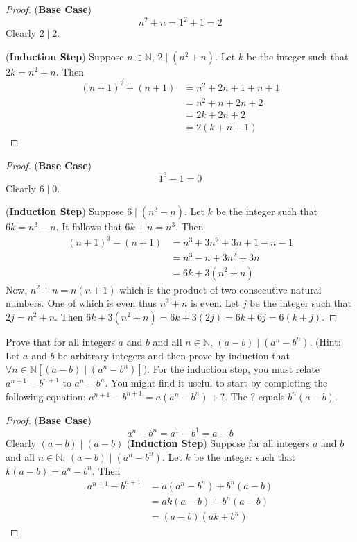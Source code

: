 \begin{proof}
    (\textbf{Base Case}) 
    \[n^2 + n = 1^2 + 1 = 2\]
    Clearly $2 \mid 2$.

    (\textbf{Induction Step})
    Suppose $n \in \mathbb{N}$, $2 \mid (n^2 + n)$.
    Let $k$ be the integer such that $2k = n^2 + n$.
    Then
    \begin{align*}
        (n + 1)^2 + (n + 1) &= n^2 + 2n + 1 + n + 1 \\
        &= n^2 + n + 2n + 2 \\
        &= 2k + 2n + 2 \\
        &= 2(k + n + 1)
    \end{align*}
\end{proof}

\begin{proof}
    (\textbf{Base Case})
    \[1^3 - 1 = 0\]
    Clearly $6 \mid 0$.

    (\textbf{Induction Step})
    Suppose $6 \mid (n^3 - n)$.
    Let $k$ be the integer such that $6k = n^3 - n$.
    It follows that $6k + n = n^3$.
    Then 
    \begin{align*}
        (n + 1)^3 - (n + 1) &= n^3 + 3n^2 + 3n + 1 - n - 1 \\
        &= n^3 - n + 3n^2 + 3n \\
        &= 6k + 3(n^2 + n)
    \end{align*}
    Now, $n^2 + n = n(n + 1)$ which is the product of two consecutive 
        natural numbers. One of which is even thus $n^2 + n$ is even.
    Let $j$ be the integer such that $2j = n^2 + n$.
    Then $6k + 3(n^2 + n) = 6k + 3(2j) = 6k + 6j = 6(k + j)$.
\end{proof}

\begin{tcolorbox}[title=Problem 13, breakable]
    Prove that for all integers $a$ and $b$ and all $n \in \mathbb{N}$,
        $(a - b) \mid (a^n - b^n)$.
    (Hint: Let $a$ and $b$ be arbitrary integers and then prove by induction 
        that $\forall{n} \in \mathbb{N}[(a - b) \mid (a^n - b^n)])$.
    For the induction step, you must relate $a^{n + 1} - b^{n + 1}$
        to $a^n - b^n$. 
    You might find it useful to start by completing the following equation:
    $a^{n + 1} - b^{n + 1} = a(a^n - b^n) + ?$.
    The $?$ equals $b^n(a - b)$.
\end{tcolorbox}

\begin{proof}
    (\textbf{Base Case}) 
    \[a^n - b^n = a^1 - b^1 = a - b\]
    Clearly $(a - b) \mid (a - b)$
    (\textbf{Induction Step}) Suppose for all integers $a$ and $b$ and all $n \in \mathbb{N}$,
        $(a - b) \mid (a^n - b^n)$.
        Let $k$ be the integer such that $k(a - b) = a^n - b^n$.
    Then 
    \begin{align*}
        a^{n + 1} - b^{n + 1} &= a(a^n - b^n) + b^n(a - b) \\
        &= a k(a - b) + b^n(a - b) \\
        &= (a - b)(ak + b^n)
    \end{align*}
\end{proof}

